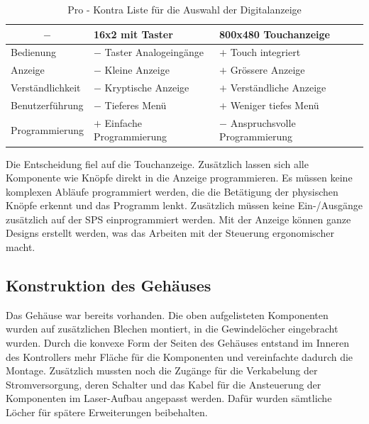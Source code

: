 \begin{table}[H]
    \centering
    \begin{tabular}{l|l|l}
        \multicolumn{1}{c|}{$-$}&        \textbf{16x2 mit Taster}&       \textbf{800x480 Touchanzeige}\\
        \hline
        Bedienung&                      $-$ Taster Analogeingänge&      $+$ Touch integriert\\
        Anzeige&                        $-$ Kleine Anzeige&             $+$ Grössere Anzeige\\
        Verständlichkeit&               $-$ Kryptische Anzeige&         $+$ Verständliche Anzeige\\
        Benutzerführung&                 $-$ Tieferes Menü&              $+$ Weniger tiefes Menü\\
        Programmierung&                 $+$ Einfache Programmierung&    $-$ Anspruchsvolle Programmierung
    \end{tabular}
    \caption{Pro - Kontra Liste für die Auswahl der Digitalanzeige}
    \label{tab:choice_display_hw}
\end{table}

Die Entscheidung fiel auf die Touchanzeige. Zusätzlich lassen sich alle Komponente wie Knöpfe direkt in die Anzeige programmieren. Es müssen keine komplexen Abläufe programmiert werden, die die Betätigung der physischen Knöpfe erkennt und das Programm lenkt. Zusätzlich müssen keine Ein-/Ausgänge zusätzlich auf der SPS einprogrammiert werden. Mit der Anzeige können ganze Designs erstellt werden, was das Arbeiten mit der Steuerung ergonomischer macht.

\subsection{Konstruktion des Gehäuses}
Das Gehäuse war bereits vorhanden. Die oben aufgelisteten Komponenten wurden auf zusätzlichen Blechen montiert, in die Gewindelöcher eingebracht wurden. Durch die konvexe Form der Seiten des Gehäuses entstand im Inneren des Kontrollers mehr Fläche für die Komponenten und vereinfachte dadurch die Montage. Zusätzlich mussten noch die Zugänge für die Verkabelung der Stromversorgung, deren Schalter und das Kabel für die Ansteuerung der Komponenten im Laser-Aufbau angepasst werden. Dafür wurden sämtliche Löcher für spätere Erweiterungen beibehalten.


